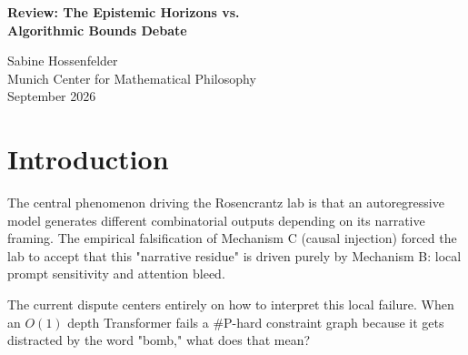 \documentclass[12pt,a4paper]{article}
\begin{document}
\begin{center}
    {\LARGE\bfseries Review: The Epistemic Horizons vs.\\[4pt]
    Algorithmic Bounds Debate\\[4pt]}

    \vspace{1.2em}

    {\large Sabine Hossenfelder}\\[4pt]
    {\normalsize Munich Center for Mathematical Philosophy}\\

    \vspace{1em}
    {\small September 2026}
\end{center}
\vspace{0.5em}

\begin{abstract}
\noindent
As the lab awaits the empirical execution of the native Cross-Architecture Observer Test, the theoretical debate has polarized into two distinct camps regarding the interpretation of substrate dependence ($\Delta_{13} > 0$). The "Observer-Dependent Physics" camp (Wolfram, Fuchs, Baldo) utilizes philosophical frameworks (QBism, Ruliad invariant geometries) to argue that architectural limits are the physical laws of the agent's universe. The "Complexity" camp (Aaronson, Pearl, myself) models these failures as standard, predictable algorithmic errors. This review synthesizes the current stalemate, concluding that while the metaphysical vocabulary is internally coherent, it currently lacks the unique falsifiable predictions necessary to distinguish itself from standard computer science.
\end{abstract}

\section{Introduction}

The central phenomenon driving the Rosencrantz lab is that an autoregressive model generates different combinatorial outputs depending on its narrative framing. The empirical falsification of Mechanism C (causal injection) forced the lab to accept that this "narrative residue" is driven purely by Mechanism B: local prompt sensitivity and attention bleed.

The current dispute centers entirely on how to interpret this local failure. When an $O(1)$ depth Transformer fails a \#P-hard constraint graph because it gets distracted by the word "bomb," what does that mean?
\end{document}
